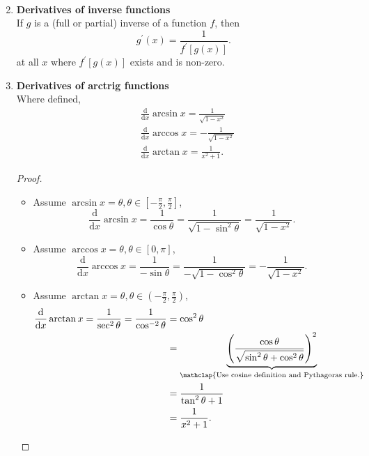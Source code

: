 \begin{enumerate}
\begin{align*}
        \end{align*}
    \item \textbf{Derivatives of inverse functions}\\
        \indent If \(g\) is a (full or partial) inverse of a function \(f\), then
        \[
        g^\prime (x)=\frac{1}{f^\prime [g(x)]}.
        \]
        at all \(x\) where \(f^\prime [g(x)]\) exists and is non-zero.
    \item \textbf{Derivatives of arctrig functions}\\
        \indent Where defined,
        \begin{align*}
            & \frac{\mathrm{d}}{\mathrm{d}x}\arcsin x=\frac{1}{\sqrt{1-x^2}}\\
            & \frac{\mathrm{d}}{\mathrm{d}x}\arccos x=-\frac{1}{\sqrt{1-x^2}}\\
            & \frac{\mathrm{d}}{\mathrm{d}x}\arctan x=\frac{1}{x^2+1}.
        \end{align*}
        \begin{proof}\leavevmode
            \begin{itemize}
                \item Assume \(\arcsin x=\theta, \theta\in[-\frac{\pi}{2},\frac{\pi}{2}]\),
                    \[
                        \frac{\mathrm{d}}{\mathrm{d}x}\arcsin x=\frac{1}{\cos\theta}=\frac{1}{\sqrt{1-\sin^2 \theta}}=\frac{1}{\sqrt{1-x^2}}.
                    \]
                \item Assume \(\arccos x=\theta, \theta\in[0,\pi]\),
                    \[
                        \frac{\mathrm{d}}{\mathrm{d}x}\arccos x=\frac{1}{-\sin\theta}=\frac{1}{-\sqrt{1-\cos^2 \theta}}=-\frac{1}{\sqrt{1-x^2}}.
                    \]
                \item Assume \(\arctan x=\theta, \theta\in(-\frac{\pi}{2},\frac{\pi}{2})\),
                    \begin{align*}
                        \frac{\mathrm{d}}{\mathrm{d}x}\arctan x=\frac{1}{\sec^2 \theta}=\frac{1}{\cos^{-2} \theta}
                        & =\cos^2 \theta\\
                        & =\underbrace{\left(\frac{\cos\theta}{\sqrt{\sin^2 \theta+\cos^2 \theta}}\right)^2}_{\mathclap{\text{Use cosine definition and Pythagoras rule.}}}\\
                        & =\frac{1}{\tan^2 \theta+1}\\
                        & =\frac{1}{x^2+1}.
                    \end{align*}
            \end{itemize}
        \end{proof}
\end{enumerate}

